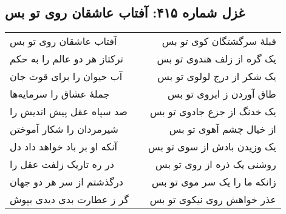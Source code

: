 \begin{center}
\section*{غزل شماره ۴۱۵: آفتاب عاشقان روی تو بس}
\label{sec:415}
\begin{longtable}{l p{0.5cm} r}
آفتاب عاشقان روی تو بس
&&
قبلهٔ سرگشتگان کوی تو بس
\\
ترکتاز هر دو عالم را به حکم
&&
یک گره از زلف هندوی تو بس
\\
آب حیوان را برای قوت جان
&&
یک شکر از درج لولوی تو بس
\\
جملهٔ عشاق را سرمایه‌ها
&&
طاق آوردن ز ابروی تو بس
\\
صد سپاه عقل پیش اندیش را
&&
یک خدنگ از جزع جادوی تو بس
\\
شیرمردان را شکار آموختن
&&
از خیال چشم آهوی تو بس
\\
آنکه او بر باد خواهد داد دل
&&
یک وزیدن بادش از سوی تو بس
\\
در ره تاریک زلفت عقل را
&&
روشنی یک ذره از روی تو بس
\\
درگذشتم از سر هر دو جهان
&&
زانکه ما را یک سر موی تو بس
\\
گر ز عطارت بدی دیدی بپوش
&&
عذر خواهش روی نیکوی تو بس
\\
\end{longtable}
\end{center}
